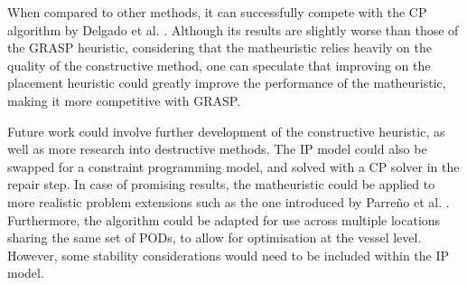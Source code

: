\documentclass[preprint,11pt,3p]{elsarticle}
\begin{document}
When compared to other methods, it can successfully compete with the CP algorithm by Delgado et al. \cite{DJJRA12}. Although its results are slightly worse than those of the GRASP heuristic, considering that the matheuristic relies heavily on the quality of the constructive method, one can speculate that improving on the placement heuristic could greatly improve the performance of the matheuristic, making it more competitive with GRASP.

Future work could involve further development of the constructive heuristic, as well as more research into destructive methods. The IP model could also be swapped for a constraint programming model, and solved with a CP solver in the repair step. In case of promising results, the matheuristic could be applied to more realistic problem extensions such as the one introduced by Parre\~{n}o et al. \cite{PPAV16}. Furthermore, the algorithm could be adapted for use across multiple locations sharing the same set of PODs, to allow for optimisation at the vessel level. However, some stability considerations would need to be included within the IP model.








%

% 
% 
% 
% 
% 
% 
% 
% 
% 
% 
% 


\end{document}
